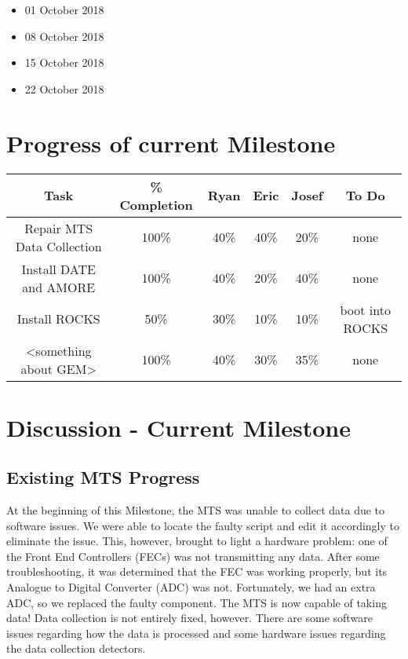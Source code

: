 \documentclass[12pt]{article}
\newcommand\tab[1][1cm]{\hspace*{#1}}
\begin{document}
\begin{itemize}
\item[] 01 October 2018
\item[] 08 October 2018
\item[] 15 October 2018
\item[] 22 October 2018
\end{itemize}

\section{Progress of current Milestone}

  \begin{center}
  \begin{tabular}{|c|c|c|c|c|c|}
    \hline
    Task & \% Completion & Ryan & Eric & Josef & To Do \\
    \hline
    Repair MTS Data Collection & 100\% & 40\% & 40\% & 20\% & none \\
    Install DATE and AMORE & 100\% & 40\% & 20\% & 40\% & none \\
    Install ROCKS & 50\% & 30\% & 10\% & 10\% & boot into ROCKS \\
    <something about GEM> & 100\% & 40\% & 30\% & 35\% & none \\
    \hline   
  \end{tabular}
\end{center}

\section{Discussion - Current Milestone}

\subsection{Existing MTS Progress}

\tab At the beginning of this Milestone, the MTS was unable to collect data due
to software issues. We were able to locate the faulty script and edit it
accordingly to eliminate the issue. This, however, brought to light a hardware
problem: one of the Front End Controllers (FECs) was not transmitting any
data. After some troubleshooting, it was determined that the FEC was working
properly, but its Analogue to Digital Converter (ADC) was not. Fortunately, we
had an extra ADC, so we replaced the faulty component. The MTS is now capable of
taking data! Data collection is not entirely fixed, however. There are some
software issues regarding how the data is processed and some hardware issues
regarding the data collection detectors.
\end{document}
